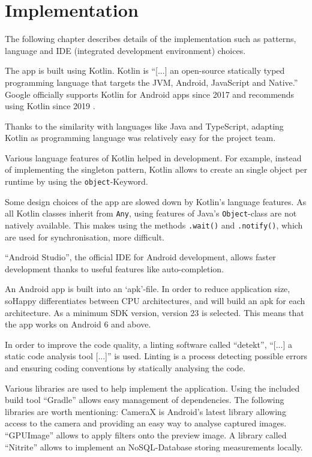 \section{Implementation} \label{sec:implementation}

The following chapter describes details of the implementation such as
patterns, language and IDE (integrated development environment) choices.

The app is built using Kotlin. Kotlin is ``[...] an open-source statically 
typed programming language that targets the JVM, Android, JavaScript and 
Native.'' \cite{kotlin2020}
Google officially supports Kotlin for Android apps since 2017
\cite{googleio2017} and recommends using Kotlin since 2019
\cite{androidkotlin2019}.

Thanks to the similarity with languages like Java and TypeScript, adapting
Kotlin as programming language was relatively easy for the project team.

Various language features of Kotlin helped in development. For example, instead of
implementing the singleton pattern, Kotlin allows to create an single object
per runtime by using the \texttt{object}-Keyword.

Some design choices of the app are slowed down by Kotlin's language features.
As all Kotlin classes inherit from \texttt{Any}, using features of Java's 
\texttt{Object}-class are not natively available. This makes using the methods
\texttt{.wait()} and \texttt{.notify()}, which are used for synchronisation,
more difficult.

``Android Studio'', the official IDE for Android development, allows faster
development thanks to useful features like auto-completion. 

An Android app is built into an `apk'-file. In order to reduce application
size, soHappy differentiates between CPU architectures, and will
build an apk for each architecture. As a minimum SDK version, version 23
is selected. This means that the app works on Android 6 and above.

In order to improve the code quality, a linting software called ``detekt'',
``[...] a static code analysis tool [...]''\cite{detekt2020} is used.
Linting is a process detecting possible errors and ensuring coding conventions
by statically analysing the code.

Various libraries are used to help implement the application. Using
the included build tool ``Gradle'' \cite{gradle} allows easy management of 
dependencies. The following libraries are worth mentioning: CameraX 
\cite{camerax} is Android's latest library allowing access to the camera and 
providing an easy way to analyse captured images. ``GPUImage'' \cite{gpuimage}
allows to apply filters onto the preview image. A library called ``Nitrite''
\cite{nitrite} allows to implement an NoSQL-Database storing measurements
locally.

